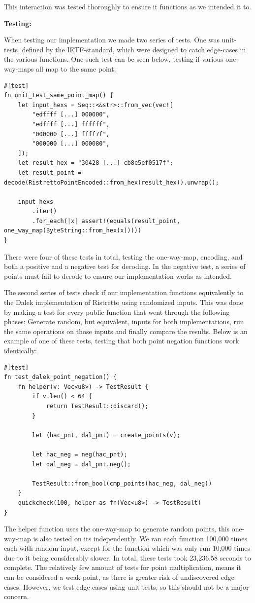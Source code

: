 \documentclass{article}
\newcommand*\ttvar[1]{\texttt{\expandafter\dottvar\detokenize{#1}\relax}}
\newcommand*\dottvar[1]{\ifx\relax#1\else
  \expandafter\ifx\string_#1\string_\allowbreak\else#1\fi
  \expandafter\dottvar\fi}
\begin{document}
This interaction was tested thoroughly to ensure it functions as we 
intended it to.

\textbf{Testing:}

When testing our implementation we made two series of tests. 
One was unit-tests, defined by the IETF-standard, which were designed 
to catch edge-cases in the various functions. One such test can be 
seen below, testing if various one-way-maps all map to the same point:

\begin{lstlisting}
#[test]
fn unit_test_same_point_map() {
	let input_hexs = Seq::<&str>::from_vec(vec![
		"edffff [...] 000000",
		"edffff [...] ffffff",
		"000000 [...] ffff7f",
		"000000 [...] 000080",
	]);
	let result_hex = "30428 [...] cb8e5ef0517f";
	let result_point = decode(RistrettoPointEncoded::from_hex(result_hex)).unwrap();

	input_hexs
		.iter()
		.for_each(|x| assert!(equals(result_point, one_way_map(ByteString::from_hex(x)))))
}
\end{lstlisting}

There were four of these tests in total, testing the one-way-map,
encoding, and both a positive and a negative test for decoding. In the
negative test, a series of points must fail to decode to ensure our
implementation works as intended.

The second series of tests check if our implementation functions
equivalently to the Dalek implementation of Ristretto using randomized
inputs. This was done by making a test for every public function that
went through the following phases: Generate random, but equivalent,
inputs for both implementations, run the same operations on those inputs
and finally compare the results. Below is an example of one of these
tests, testing that both point negation functions work identically:

\begin{lstlisting}
#[test]
fn test_dalek_point_negation() {
	fn helper(v: Vec<u8>) -> TestResult {
		if v.len() < 64 {
			return TestResult::discard();
		}

		let (hac_pnt, dal_pnt) = create_points(v);

		let hac_neg = neg(hac_pnt);
		let dal_neg = dal_pnt.neg();

		TestResult::from_bool(cmp_points(hac_neg, dal_neg))
	}
	quickcheck(100, helper as fn(Vec<u8>) -> TestResult)
}
\end{lstlisting}

The \ttvar{create_points()} helper function uses the one-way-map
to generate random points, this one-way-map is also tested on its
independently. We ran each function 100,000 times each with random
input, except for the \ttvar{mul()} function which was only run 10,000
times due to it being considerably slower. In total, these tests took
23,236.58 seconds to complete. The relatively few amount of tests
for point multiplication, means it can be considered a weak-point,
as there is greater risk of undiscovered edge cases. However, we test
edge cases using unit tests, so this should not be a major concern.
\end{document}
